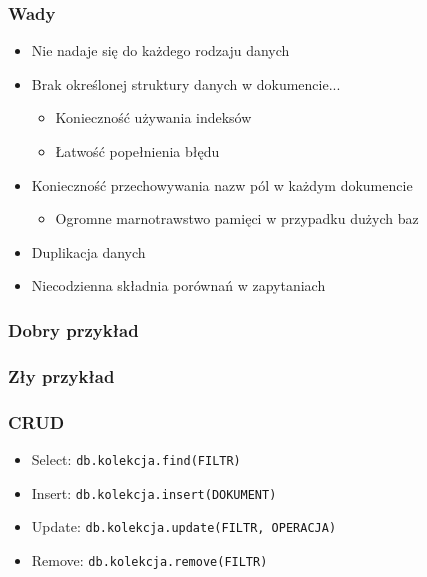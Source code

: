 \documentclass{beamer}
\begin{document}
  \begin{frame}
    \frametitle{Wady}
    \begin{itemize}
      \item Nie nadaje się do każdego rodzaju danych
      \item Brak określonej struktury danych w dokumencie...
      \begin{itemize}
        \item Konieczność używania indeksów
		\item Łatwość popełnienia błędu
      \end{itemize}
      \item Konieczność przechowywania nazw pól w każdym dokumencie
      \begin{itemize}
        \item Ogromne marnotrawstwo pamięci w przypadku dużych baz
      \end{itemize}
      \item Duplikacja danych
      \item Niecodzienna składnia porównań w zapytaniach
    \end{itemize}
  \end{frame}

  \begin{frame}
    \frametitle{Dobry przykład}
  \end{frame}

  \begin{frame}
    \frametitle{Zły przykład}
  \end{frame}

  \begin{frame}
    \frametitle{CRUD}
    \begin{itemize}
      \item Select: \texttt{db.kolekcja.find(FILTR)}
      
      \item Insert: \texttt{db.kolekcja.insert(DOKUMENT)}
      
      \item Update: \texttt{db.kolekcja.update(FILTR, OPERACJA)}
      
      \item Remove: \texttt{db.kolekcja.remove(FILTR)}
      
    \end{itemize}
  \end{frame}
\end{document}
